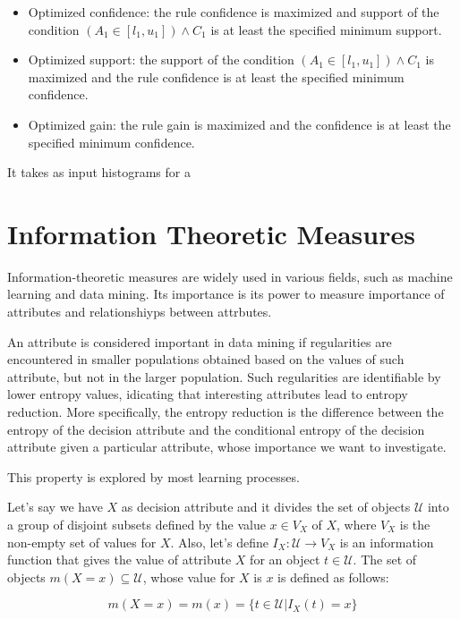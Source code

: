 \begin{itemize}
 \item Optimized confidence: the rule confidence is maximized and  support of the condition $(A_1 \in [l_1,u_1]) \wedge
C_1$ is at least the specified minimum support.
  \item Optimized support: the support of the condition $(A_1 \in [l_1,u_1]) \wedge C_1$ is maximized and the rule
confidence is at least the specified minimum confidence.
  \item Optimized gain: the rule gain is maximized and the confidence is at least the specified minimum confidence.
\end{itemize}

It takes as input histograms for a 




\section{Information Theoretic Measures}

Information-theoretic measures are widely used in various fields, such as machine learning and data mining. Its
importance is its power to measure importance of attributes and relationshiyps between attrbutes.

An attribute is considered important in data mining if regularities are encountered in smaller populations obtained
based on the values of such attribute, but not in the larger population. Such regularities are identifiable by lower
entropy values, idicating that interesting attributes lead to entropy reduction. More specifically, the entropy
reduction is the difference between the entropy of the decision attribute and the conditional entropy of the decision
attribute given a particular attribute, whose importance we want to investigate.

This property is explored by most learning processes. 

Let's say we have $X$ as decision attribute and it divides the set of objects $\mathcal{U}$ into a group of disjoint
subsets
defined by the value $x \in V_X$ of $X$, where $V_X$ is the non-empty set of values for $X$. Also, let's define $I_X :
\mathcal{U} \rightarrow V_X$ is an information function that gives the value of attribute $X$ for an object $t \in
\mathcal{U}$. The set of
objects $m(X=x) \subseteq \mathcal{U}$, whose value for $X$ is $x$ is defined as follows:

\begin{equation}
 m(X=x)=m(x)=\{t \in \mathcal{U} | I_X(t)=x\}
\end{equation}

